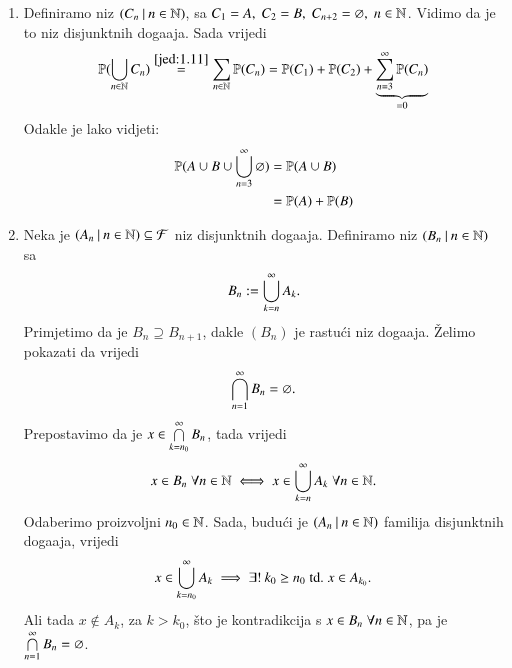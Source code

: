\begin{rj}[\ref{zad:1.12}]
    \begin{enumerate}[label=(\alph*)]
        \item Definiramo niz $({C_n} \: | \: {n \in \mathbb{N}})$, sa $C_1 = A, \; C_2 = B, \; C_{n + 2} = \varnothing, \; n \in \mathbb{N}$.
            Vidimo da je to niz disjunktnih doga\dj aja.
            Sada vrijedi
            \begin{equation*}
                \mathbb{P}({\bigcup\limits_{n \in \mathbb{N}}^{} C_n}) \overset{\eqref{jed:1.11}}{=} \sum\limits_{n \in \mathbb{N}}^{} \mathbb{P}({C_n}) = \mathbb{P}({C_1}) + \mathbb{P}({C_2}) + \underbrace{\sum\limits_{n = 3}^{\infty} \mathbb{P}({C_n})}_{=0}
            \end{equation*}
            Odakle je lako vidjeti:
            \begin{align*}
                \mathbb{P}({A \cup B \cup \bigcup\limits_{n = 3}^{\infty} \varnothing}) &= \mathbb{P}({A \cup B}) \\
                &= \mathbb{P}({A}) + \mathbb{P}({B})
            \end{align*}
        \item Neka je $({A_n} \: | \: {n \in \mathbb{N}}) \subseteq \mathcal{F}$ niz disjunktnih doga\dj aja.
        Definiramo niz $({B_n} \: | \: {n \in \mathbb{N}})$ sa
        \begin{equation*}
            B_n := \bigcup\limits_{k = n}^{\infty} A_k.
        \end{equation*}
        Primjetimo da je $B_n \supseteq B_{n + 1}$, dakle $(B_n)$ je rastu\' ci niz doga\dj aja.
        \v Zelimo pokazati da vrijedi
        \begin{equation*}
            \bigcap\limits_{n = 1}^{\infty} B_n = \varnothing.
        \end{equation*}
        Prepostavimo da je $x \in \bigcap\limits_{k = n_0}^{\infty} B_n$, tada vrijedi
        \begin{equation*}
            x \in B_n \; \forall n \in \mathbb{N} \iff x \in \bigcup\limits_{k = n}^{\infty} A_k \; \forall n \in \mathbb{N}.
        \end{equation*}
        Odaberimo proizvoljni $n_0 \in \mathbb{N}$.
        Sada, budu\' ci je $({A_n} \: | \: {n \in \mathbb{N}})$ familija disjunktnih doga\dj aja, vrijedi
        \begin{equation*}
            x \in \bigcup\limits_{k = n_0}^{\infty} A_k \implies \exists ! \: k_0 \geq n_0 \; \mathrm{td.} \; x \in A_{k_0}.
        \end{equation*}
        Ali tada $x \notin A_k$, za $k > k_0$, \v sto je kontradikcija s $x \in B_n \; \forall n \in \mathbb{N}$, pa je $\bigcap\limits_{n = 1}^{\infty} B_n = \varnothing$.\\

\end{enumerate}
\end{rj}
